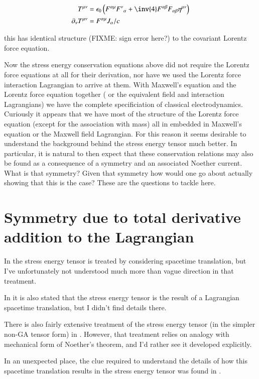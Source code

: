 \documentclass{article}
\begin{document}
\begin{align}
T^{\mu\nu} &= {\epsilon_0} \left( F^{\alpha\mu} {F^{\nu}}_{\alpha} + \inv{4} F^{\alpha\beta} F_{\alpha\beta} \eta^{\mu\nu} \right) \\
\partial_\nu T^{\mu\nu} &= F^{\alpha\mu} J_\alpha/c
\end{align}

this has identical structure (FIXME: sign error here?) to the
covariant Lorentz force equation.

Now the stress energy conservation equations above did not require
the Lorentz force equations at all for their derivation, nor have we
used the Lorentz force interaction Lagrangian to arrive at them.  
With Maxwell's equation and the Lorentz force equation together (
or the equivalent field and interaction Lagrangians) we have
the complete specificiation of classical electrodynamics.  Curiously
it
appears that we have most of the structure of the Lorentz force equation
(except for the association with mass) all in embedded in Maxwell's equation
or the Maxwell field Lagrangian.  For this reason it seems desirable to
understand the background behind the stress energy tensor much better.
In particular, it is natural to then expect that these conservation
relations may also be found as a 
consequence of a symmetry and an associated Noether current.  What
is that symmetry?  Given that symmetry how would one go about
actually showing that this is the case?   These are the questions
to tackle here.

\section{ Symmetry due to total derivative addition to the Lagrangian }

In \cite{doran2003gap} the stress energy tensor is treated 
by considering spacetime translation, but I've unfortunately
not understood much more than vague direction in that treatment.

In \cite{srednicki2007qft} it is also stated that the stress energy tensor
is the result of a Lagrangian spacetime translation, but I didn't find
details there.

There is also fairly extensive treatment
of the stress energy tensor (in the simpler non-GA tensor form) in
\cite{jackson1975cew}.  However, that treatment relies on analogy with
mechanical form of Noether's theorem, and I'd rather see it developed
explicitly.

In an unexpected place, the 
clue required to understand the details of 
how this spacetime translation results in the stress energy tensor
was found in
\cite{TongQFT}.
\end{document}
